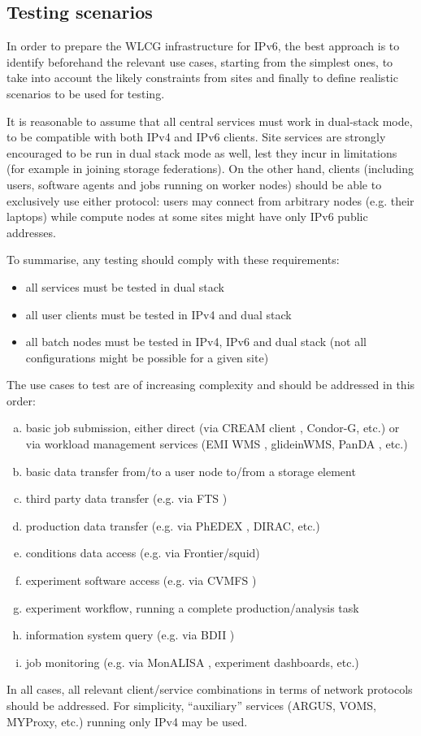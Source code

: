 \subsection{Testing scenarios}
In order to prepare the WLCG infrastructure for IPv6, the best
approach is to identify beforehand the relevant use cases, starting
from the simplest ones, to take into account the likely constraints
from sites and finally to define realistic scenarios to be used for
testing.

It is reasonable to assume that all central services must work in
dual-stack mode, to be compatible with both IPv4 and IPv6
clients. Site services are strongly encouraged to be run in dual stack
mode as well, lest they incur in limitations (for example in joining
storage federations). On the other hand, clients (including users,
software agents and jobs running on worker nodes) should be able to
exclusively use either protocol: users may connect from arbitrary
nodes (e.g. their laptops) while compute nodes at some sites might have
only IPv6 public addresses.

To summarise, any testing should comply with these requirements:
\begin{itemize}
\item all services must be tested in dual stack
\item all user clients must be tested in IPv4 and dual stack
\item all batch nodes must be tested in IPv4, IPv6 and dual stack (not all configurations might be possible for a given site)
\end{itemize}

The use cases to test are of increasing complexity and should be addressed in this order:
\begin{enumerate}[a.]
\item basic job submission, either direct (via CREAM client \cite{cream}, Condor-G, etc.) or via workload management services (EMI WMS \cite{wms}, glideinWMS, PanDA \cite{panda}, etc.)
\item basic data transfer from/to a user node to/from a storage element
\item third party data transfer (e.g. via FTS \cite{fts})
\item production data transfer (e.g. via PhEDEX \cite{phedgen}, DIRAC, etc.)
\item conditions data access (e.g. via Frontier/squid)
\item experiment software access (e.g. via CVMFS \cite{cvmfs})
\item experiment workflow, running a complete production/analysis task
\item information system query (e.g. via BDII \cite{bdii})
\item job monitoring (e.g. via MonALISA \cite{monalisa}, experiment dashboards, etc.)
\end{enumerate}
In all cases, all relevant client/service combinations in terms of network protocols should be addressed. For simplicity, ``auxiliary'' services (ARGUS, VOMS, MYProxy, etc.) running only IPv4 may be used.


